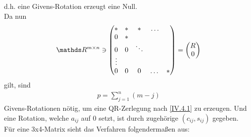 d.h. eine Givens-Rotation erzeugt eine Null.\\
Da nun
\begin{gather*}
  \R^{m\times n}\ni \begin{pmatrix}
    * & * &* & \dots   \\
    0 & * &     \\
    0 & 0 & \ddots \\
    \vdots \\
    0 & 0 & 0 & \dots & *		
  \end{pmatrix}
  = \begin{pmatrix} R\\0\end{pmatrix}
\end{gather*}
gilt, sind
\begin{gather*}
  p=\sum_{j=1}^{n}(m-j)
\end{gather*}
Givens-Rotationen nötig, um eine QR-Zerlegung nach \eqref{IV.4.1} zu erzeugen.
Und eine Rotation, welche $a_{ij} $ auf 0 setzt, ist durch zugehörige 
$(c_{ij}, s_{ij}) $ gegeben.\\

Für eine 3x4-Matrix sieht das Verfahren folgendermaßen aus:

